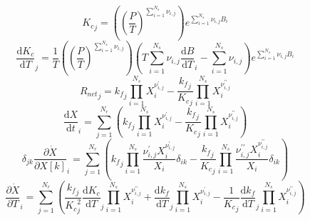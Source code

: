 \documentclass[a4paper,10pt]{article}
\begin{document}
\begin{equation}{K_c}_{j} = \left(\left(\frac{P}{T}\right)^{\sum_{i=1}^{N_s} \nu_{i,j}}\right) e^{\sum_{i=1}^{N_s} \nu_{i,j} B_{i}}\end{equation}
\begin{equation}\frac{\text{d} {K_c} }{\text{d} T }_{j} = \frac{1}{T} \left(\left(\frac{P}{T}\right)^{\sum_{i=1}^{N_s} \nu_{i,j}}\right) \left(T \sum_{i=1}^{N_s} \nu_{i,j} \frac{\text{d} B }{\text{d} T }_{i} - \sum_{i=1}^{N_s} \nu_{i,j}\right) e^{\sum_{i=1}^{N_s} \nu_{i,j} B_{i}}\end{equation}
\begin{equation}{R_{net}}_{j} = {k_f}_{j} \prod_{i=1}^{N_s} X_{i}^{\nu^{\prime}_{i,j}} - \frac{{k_f}_{j}}{{K_c}_{j}} \prod_{i=1}^{N_s} X_{i}^{\nu^{\prime\prime}_{i,j}}\end{equation}
\begin{equation}\frac{\text{d} X }{\text{d} t }_{i} = \sum_{j=1}^{N_r} \left({k_f}_{j} \prod_{i=1}^{N_s} X_{i}^{\nu^{\prime}_{i,j}} - \frac{{k_f}_{j}}{{K_c}_{j}} \prod_{i=1}^{N_s} X_{i}^{\nu^{\prime\prime}_{i,j}}\right)\end{equation}
\begin{equation}\delta_{j k} \frac{\partial \dot{X} }{\partial X[k] }_{i} = \sum_{j=1}^{N_r} \left({k_f}_{j} \prod_{i=1}^{N_s} \frac{\nu^{\prime}_{i,j} X_{i}^{\nu^{\prime}_{i,j}}}{X_{i}} \delta_{i k} - \frac{{k_f}_{j}}{{K_c}_{j}} \prod_{i=1}^{N_s} \frac{\nu^{\prime\prime}_{i,j} X_{i}^{\nu^{\prime\prime}_{i,j}}}{X_{i}} \delta_{i k}\right)\end{equation}
\begin{equation}\frac{\partial \dot{X} }{\partial T }_{i} = \sum_{j=1}^{N_r} \left(\frac{{k_f}_{j}}{{K_c}_{j}^{2}} \frac{\text{d} {K_c} }{\text{d} T }_{j} \prod_{i=1}^{N_s} X_{i}^{\nu^{\prime\prime}_{i,j}} + \frac{\text{d} {k_f} }{\text{d} T }_{j} \prod_{i=1}^{N_s} X_{i}^{\nu^{\prime}_{i,j}} - \frac{1}{{K_c}_{j}} \frac{\text{d} {k_f} }{\text{d} T }_{j} \prod_{i=1}^{N_s} X_{i}^{\nu^{\prime\prime}_{i,j}}\right)\end{equation}
\end{document}
